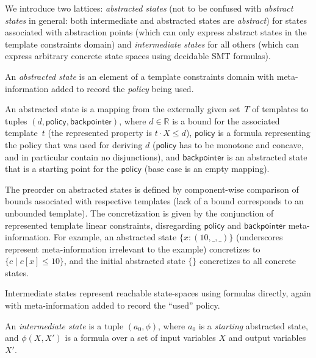 \documentclass{llncs}
\newcommand{\tuple}[1]{\ensuremath{\left( #1 \right) }}
\newcommand{\Real}{\ensuremath{\mathbb{R}}}
\begin{document}
We introduce two lattices: \emph{abstracted states} (not to be confused
    with \emph{abstract states} in general: both intermediate and abstracted
    states are \emph{abstract}) for states
associated with abstraction points (which can only express abstract states in the template
constraints domain)
and \emph{intermediate states} for all others
(which can express arbitrary concrete state spaces using decidable SMT formulas).

An \emph{abstracted state} is an element of a template
constraints domain with meta-information added to record the \emph{policy} being used.

\begin{definition}
    An abstracted state is a mapping from the externally given set~$T$ of templates
    to tuples $\tuple{d, \mathsf{policy},
    \mathsf{backpointer}}$, where $d \in \Real$ is a bound for the
    associated template~$t$ (the represented property is $t\cdot X \leq d$),
    $\mathsf{policy}$ is a formula representing the policy that was used for deriving $d$
    ($\mathsf{policy}$ has to be monotone and concave, and in particular contain
    no disjunctions), and $\mathsf{backpointer}$ is an abstracted state that
    is a starting point for the $\mathsf{policy}$
    (base case is an empty mapping).
    \label{def:abstracted_state}
\end{definition}

The preorder on abstracted states is defined by component-wise
comparison
of bounds associated with respective templates (lack of a bound
corresponds to an unbounded template).
The concretization is given by the
conjunction of represented template linear constraints, disregarding
$\mathsf{policy}$ and $\mathsf{backpointer}$ meta-information.
For example, an abstracted state $\{ x: \tuple{10, \_, \_} \}$ (underscores
represent meta-information irrelevant to the example) concretizes to
\mbox{$\{ c \mid c[x] \leq 10 \}$},
and the initial abstracted state $\{ \}$ concretizes to all concrete states.

Intermediate states represent reachable state-spaces using formulas directly,
again with meta-information added to record the ``used'' policy.

\begin{definition}
    An \emph{intermediate state} is a tuple $\tuple{a_0, \phi}$, where $a_0$ is
    a \emph{starting} abstracted state, and $\phi(X, X')$
    is a formula over a set of input variables $X$
    and output variables $X'$.
    \label{def:intermediate_state}
\end{definition}
\end{document}
